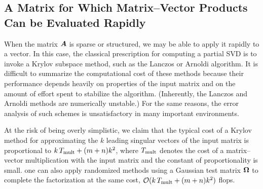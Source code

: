 \documentclass[12pt]{article}
\begin{document}
\lsp


\subsection{A Matrix for Which Matrix--Vector Products Can be Evaluated Rapidly}

When the matrix $\bm{A}$ is sparse or structured, we may be able to apply
it rapidly to a vector.  In this case, the classical prescription for computing
a partial SVD is to invoke a Krylov subspace method, such as the Lanczos or Arnoldi
algorithm.  It is difficult to summarize the computational cost of these methods because
their performance depends heavily on properties of the input matrix
and on the amount of effort spent to stabilize the algorithm.
(Inherently, the Lanczos and Arnoldi methods are numerically unstable.)
For the same reasons, the error analysis of such schemes is unsatisfactory
in many important environments.


At the risk of being overly simplistic, we claim that the typical
cost of a Krylov method for approximating the $k$ leading singular vectors
of the input matrix is proportional to $k \, T_{\rm mult} + (m+n) k^2$,
where $T_{\rm mult}$ denotes the cost of a matrix--vector multiplication with
the input matrix and the constant of proportionality is small.
one can also apply randomized methods using a Gaussian test matrix
$\bm{\Omega}$ to complete the factorization at the same cost,
$\mathcal{O}(k \, T_{\rm mult} + (m+n)k^2)$ flops.

\end{document}
